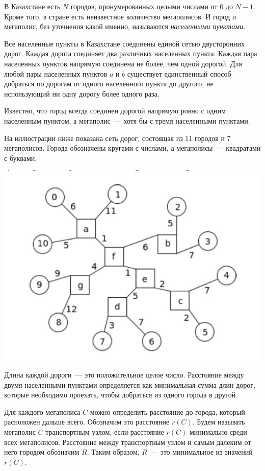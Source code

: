 В Казахстане есть $N$ городов, пронумерованных целыми числами от 0 до $N - 1$. Кроме того, в
стране есть неизвестное количество мегаполисов. И город и мегаполис, без уточнения какой
именно, называются \textit{населенными пунктами}.

Все населенные пункты в Казахстане соединены единой сетью двусторонних дорог. Каждая
дорога соединяет два различных населенных пункта. Каждая пара населенных пунктов
напрямую соединена не более, чем одной дорогой. Для любой пары населенных пунктов $a$ и $b$
существует единственный способ добраться по дорогам от одного населенного пункта до
другого, не использующий ни одну дорогу более одного раза.

Известно, что город всегда соединен дорогой напрямую ровно с одним населенным пунктом, а
мегаполис~--- хотя бы с тремя населенными пунктами.

На иллюстрации ниже показана сеть дорог, состоящая из 11 городов и 7 мегаполисов. Города
обозначены кругами с числами, а мегаполисы~--- квадратами с буквами.

\includegraphics[scale=0.8]{towns.png}

Длина каждой дороги~--- это положительное целое число. Расстояние между двумя
населенными пунктами определяется как минимальная сумма длин дорог, которые
необходимо проехать, чтобы добраться из одного города в другой.

Для каждого мегаполиса $C$ можно определить расстояние до города, который расположен
дальше всего. Обозначим это расстояние $r(C)$. Будем называть мегаполис $C$ транспортным
узлом, если расстояние $r(C)$ минимально среди всех мегаполисов. Расстояние между
транспортным узлом и самым далеким от него городом обозначим $R$. Таким образом, $R$~---
это минимальное из значений $r(C)$.

